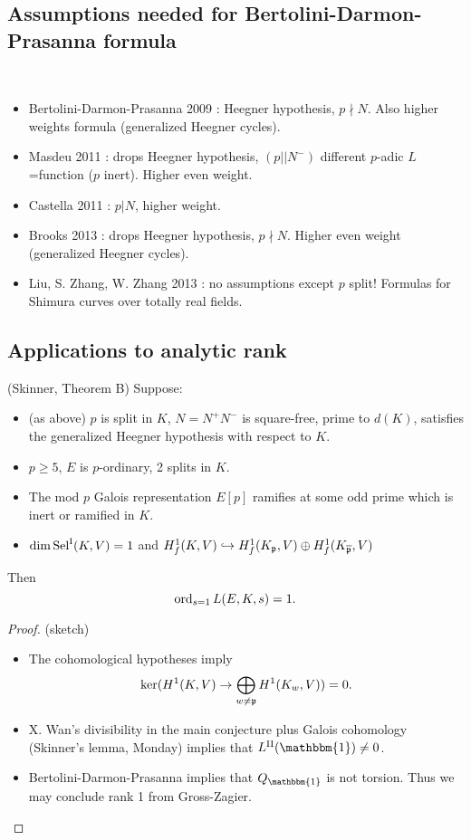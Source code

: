 \documentclass[12pt,amsfont]{amsart}
\begin{document}
\subsection{Assumptions needed for Bertolini-Darmon-Prasanna formula}
{\ }

\begin{itemize}
\item
Bertolini-Darmon-Prasanna 2009 : Heegner hypothesis, $p \nmid N$. Also higher weights formula (generalized Heegner cycles). 
\item
Masdeu 2011 : drops Heegner hypothesis, $(p || N^{-})$ different $p$-adic $L$=function ($p$ inert). Higher even weight. 
\item
Castella 2011 : $p | N$, higher weight.
\item
Brooks 2013 : drops Heegner hypothesis, $p \nmid N$. Higher even weight (generalized Heegner cycles). 
\item
Liu, S. Zhang, W. Zhang 2013 : no assumptions except $p$ split! Formulas for Shimura curves over totally real fields.

\end{itemize}

\subsection{Applications to analytic rank}

\begin{thm} (Skinner, Theorem B) Suppose:
\begin{itemize}
\item
(as above) $p$ is split in $K$, $N = N^+ N^{-}$ is square-free, prime to $d(K)$, satisfies the generalized Heegner hypothesis with respect to $K$. 
\item
$p \geq 5$, $E$ is $p$-ordinary, 2 splits in $K$. 
\item
The mod $p$ Galois representation $E[p]$ ramifies at some odd prime which is inert or ramified in $K$.
\item
$\dim \operatorname{Sel}^{\text{I}}(K,V) = 1$ and $H_f^1(K,V) \hookrightarrow H_f^1(K_{\mathfrak{p}}, V) \oplus H_f^1(K_{\overline{\mathfrak{p}}}, V)$
\end{itemize}
Then
\[\operatorname{ord}_{s=1} L(E,K,s) = 1.\]
\end{thm}

\begin{proof} (sketch) 
\begin{itemize}
\item 
The cohomological hypotheses imply
\[\ker(H^1(K,V) \rightarrow \bigoplus_{w \ne \mathfrak{p}} H^1(K_w, V)) = 0.\]
\item
X. Wan's divisibility in the main conjecture plus Galois cohomology (Skinner's lemma, Monday) implies that $L^{\text{II}}(\mathbbm{1}) \ne 0$. 
\item
Bertolini-Darmon-Prasanna  implies that $Q_{\mathbbm{1}}$ is not torsion. Thus we may conclude rank 1 from Gross-Zagier.
\end{itemize}
\end{proof}
\end{document}
